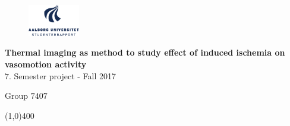 \clearpage
\thispagestyle{empty}

\begin{figure}[H]
	\raggedleft
	\includegraphics[width=0.2\textwidth]{figures/aaulogo-da.png}
\end{figure} 

\vspace{5 cm}

\begin{center}	
	\begin{Huge}
		\textbf{Thermal imaging as method to study effect of induced ischemia on vasomotion activity}\\
		\vspace{5 mm}
		$7.$ Semester project - Fall 2017\\
		\vspace{3 mm}
	\end{Huge}
	{\Large Group $7407$}
\end{center}
\vspace*{\fill}

\begin{center}
	\line(1,0){400}
\end{center}

